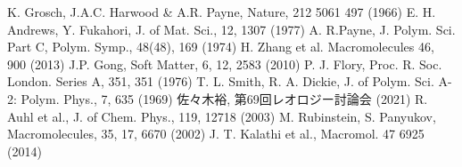 \documentclass[uplatex,10pt,a4paper,twocolumn]{jsarticle}
\begin{document}
\begin{thebibliography}{99}
     K. Grosch, J.A.C. Harwood \& A.R. Payne, Nature, 212 5061 497 (1966)
     E. H. Andrews, Y. Fukahori, J. of Mat. Sci., 12, 1307 (1977)
     A. R.Payne, J. Polym. Sci. Part C, Polym. Symp., 48(48), 169 (1974)
     H. Zhang et al. Macromolecules 46, 900 (2013)
     J.P. Gong, Soft Matter, 6, 12, 2583 (2010)
     P. J. Flory, Proc. R. Soc. London. Series A, 351, 351 (1976)
     T. L. Smith, R. A. Dickie, J. of Polym. Sci. A-2: Polym. Phys., 7, 635 (1969)
     佐々木裕, 第69回レオロジー討論会 (2021)
     R. Auhl et al., J. of Chem. Phys., 119, 12718 (2003)
     M. Rubinstein, S. Panyukov, Macromolecules, 35, 17, 6670 (2002)
     J. T. Kalathi et al., Macromol. 47 6925 (2014)
\end{thebibliography}
\end{document}
